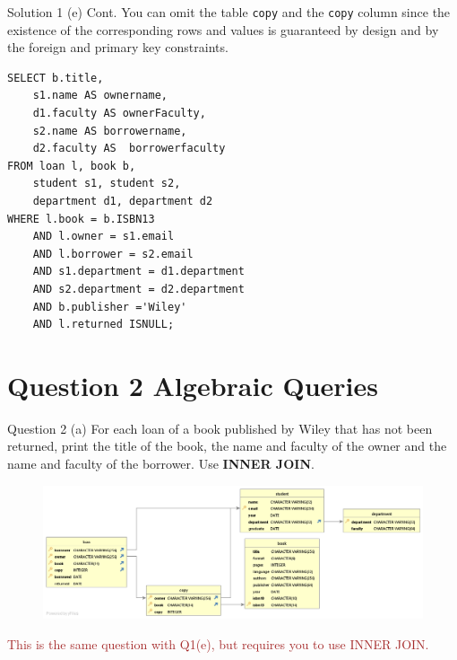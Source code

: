 \begin{frame}[fragile]{Solution 1 (e) Cont.}
You can omit the table \texttt{copy}  and the \texttt{copy} column since the existence of the corresponding rows and values is guaranteed by design and by the foreign and primary key constraints.
	
\begin{lstlisting}
SELECT b.title, 
	s1.name AS ownername, 
	d1.faculty AS ownerFaculty, 
	s2.name AS borrowername, 
	d2.faculty AS  borrowerfaculty
FROM loan l, book b,  
	student s1, student s2, 
	department d1, department d2
WHERE l.book = b.ISBN13
	AND l.owner = s1.email
	AND l.borrower = s2.email
	AND s1.department = d1.department
	AND s2.department = d2.department
	AND b.publisher ='Wiley'
	AND l.returned ISNULL;
\end{lstlisting}

\end{frame}

\section*{Question 2 Algebraic Queries}

\begin{frame}[fragile]{Question 2 (a)}
For each loan of a book published by Wiley that has not been returned, print the title of the book, the name and faculty of the owner and the name and faculty of the borrower. Use \textbf{INNER JOIN}.

\begin{figure}
	\includegraphics[width=1\textwidth]{t1/images/t1-end.png}
\end{figure}

\textcolor{brown}{This is the same question with Q1(e), but requires you to use INNER JOIN.}
\end{frame}

